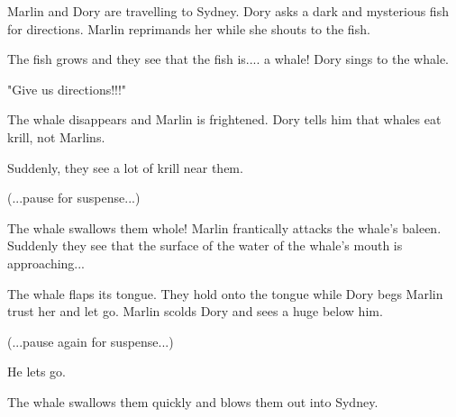 Marlin and Dory are travelling to Sydney.  Dory asks a dark and mysterious fish for directions.  Marlin reprimands her while she shouts to the fish.  

The fish grows and they see that the fish is.... a whale!  Dory sings to the whale. 

"Give us directions!!!"

The whale disappears and Marlin is frightened.  Dory tells him that whales eat krill, not Marlins.

Suddenly, they see a lot of krill near them.

(...pause for suspense...)

The whale swallows them whole!  Marlin frantically attacks the whale's baleen.  Suddenly they see that the surface of the water of the whale's mouth is approaching...

The whale flaps its tongue.  They hold onto the tongue while Dory begs Marlin trust her and let go.  Marlin scolds Dory and sees a huge  below him.

(...pause again for suspense...)

He lets go.

The whale swallows them quickly and blows them out into Sydney.
